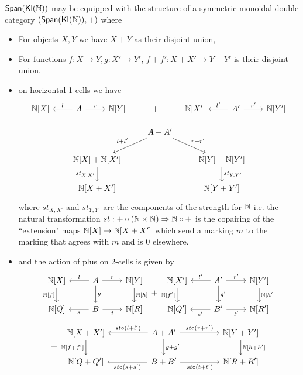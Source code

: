 \begin{prop}
$\mathsf{Span}(\mathsf{\mathsf{Kl}(\mathbb{N}) })$ may be equipped with the structure of a symmetric monoidal double category $(
\mathsf{Span}(\mathsf{\mathsf{Kl}(\mathbb{N}) }),+)$ where
\begin{itemize}
    \item For objects $X,Y$ we have $X + Y$ as their disjoint union,
    \item For functions $f: X \to Y, g: X' \to Y'$, $f + f' : X +  X' \to Y + Y'$ is their disjoint union.
    \item on horizontal 1-cells we have
    \[\begin{tikzcd}
    \N[X] &\ar[l,"l",swap]  A \ar[r,"r"] &\N[Y] & + & \N[X'] &\ar[l,"l'",swap]  A' \ar[r,"r'"] &\N[Y']
\end{tikzcd}\]

\[ \begin{tikzcd}
	& {A + A'} \\
	{\N[X] + \N[X']} && {\N[Y] + \N[Y']} \\
	{\N[X + X']} && {\N[Y+Y']}
	\arrow["{l+l'}"', from=1-2, to=2-1]
	\arrow["{r+r'}", from=1-2, to=2-3]
	\arrow["{st_{X,X'}}"', from=2-1, to=3-1]
	\arrow["{st_{Y,Y'}}", from=2-3, to=3-3]
\end{tikzcd}\]
 where $st_{X,X'}$ and $st_{Y,Y'}$ are the components of the strength for $\mathbb{N}$ i.e. the natural transformation $st :  + \circ (\mathbb{N} \times \mathbb{N}) \Rightarrow \mathbb{N} \circ +$ is the copairing of the ``extension" maps $\mathbb{N}[X] \to \mathbb{N}[X + X']$ which send a marking $m$ to the marking that agrees with $m$ and is $0$ elsewhere.
 \item and the action of plus on 2-cells is given by
 \[\begin{tikzcd}
	\N[X] & A & \N[Y] \\
	\N[Q] & B & \N[R]
	\arrow["{\N[f]}"', from=1-1, to=2-1]
	\arrow["l"', from=1-2, to=1-1]
	\arrow["r", from=1-2, to=1-3]
	\arrow["{s}", from=2-2, to=2-1]
	\arrow["{t}"', from=2-2, to=2-3]
	\arrow["{\N[h]}", from=1-3, to=2-3]
	\arrow["g", from=1-2, to=2-2]
\end{tikzcd} + \begin{tikzcd}
	{\N[X']} & {A'} & {\N[Y']} \\
	{\N[Q']} & {B'} & {\N[R']}
	\arrow["{\N[f']}"', from=1-1, to=2-1]
	\arrow["{l'}"', from=1-2, to=1-1]
	\arrow["{r'}", from=1-2, to=1-3]
	\arrow["{s'}", from=2-2, to=2-1]
	\arrow["{t'}"', from=2-2, to=2-3]
	\arrow["{\N[h']}", from=1-3, to=2-3]
	\arrow["{g'}", from=1-2, to=2-2]
\end{tikzcd}\] 
\[=\begin{tikzcd}
	{\N[X+ X']} && {A+A'} && {\N[Y+Y']} \\
	{\N[Q+Q']} && {B+B'} && {\N[R+R']}
	\arrow["{st \circ (l + l')}"', from=1-3, to=1-1]
	\arrow["{st \circ (r + r')}", from=1-3, to=1-5]
	\arrow["{st \circ (s + s')}", from=2-3, to=2-1]
	\arrow["{st \circ (t + t')}"', from=2-3, to=2-5]
	\arrow["{g+g'}", from=1-3, to=2-3]
	\arrow["{\N[h+h']}", from=1-5, to=2-5]
	\arrow["{\N[f+f']}"', from=1-1, to=2-1]
\end{tikzcd}\]
\end{itemize}
\end{prop}
